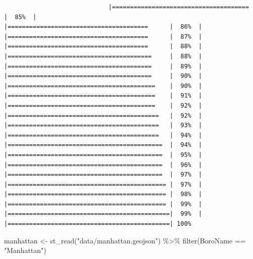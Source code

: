 \documentclass[
  krantz2]{krantz}
\makeatletter
\newenvironment{Shaded}{\begin{snugshade}}{\end{snugshade}}
\newcommand{\FunctionTok}[1]{\textcolor[rgb]{0,0,0}{#1}}
\newcommand{\NormalTok}[1]{#1}
\newcommand{\OtherTok}[1]{\textcolor[rgb]{0.37,0.37,0.37}{#1}}
\newcommand{\SpecialCharTok}[1]{\textcolor[rgb]{0,0,0}{#1}}
\newcommand{\StringTok}[1]{\textcolor[rgb]{0.5,0.5,0.5}{#1}}
\newenvironment{kframe}{%
\medskip{}
\setlength{\fboxsep}{.8em}
 \def\at@end@of@kframe{}%
 \ifinner\ifhmode%
  \def\at@end@of@kframe{\end{minipage}}%
  \begin{minipage}{\columnwidth}%
 \fi\fi%
 \def\FrameCommand##1{\hskip\@totalleftmargin \hskip-\fboxsep
 \colorbox{shadecolor}{##1}\hskip-\fboxsep
     \hskip-\linewidth \hskip-\@totalleftmargin \hskip\columnwidth}%
 \MakeFramed {\advance\hsize-\width
   \@totalleftmargin\z@ \linewidth\hsize
   \@setminipage}}%
 {\par\unskip\endMakeFramed%
 \at@end@of@kframe}
\renewenvironment{Shaded}{\begin{kframe}}{\end{kframe}}
\makeatother
\begin{document}
\begin{verbatim}
                             |======================================       |  85%  |                                                     |=======================================      |  86%  |                                                     |=======================================      |  87%  |                                                     |=======================================      |  88%  |                                                     |========================================     |  88%  |                                                     |========================================     |  89%  |                                                     |========================================     |  90%  |                                                     |=========================================    |  90%  |                                                     |=========================================    |  91%  |                                                     |=========================================    |  92%  |                                                     |==========================================   |  92%  |                                                     |==========================================   |  93%  |                                                     |==========================================   |  94%  |                                                     |===========================================  |  94%  |                                                     |===========================================  |  95%  |                                                     |===========================================  |  96%  |                                                     |===========================================  |  97%  |                                                     |============================================ |  97%  |                                                     |============================================ |  98%  |                                                     |============================================ |  99%  |                                                     |=============================================|  99%  |                                                     |=============================================| 100%
\end{verbatim}

\begin{Shaded}
\begin{Highlighting}[]
\NormalTok{manhattan }\OtherTok{\textless{}{-}} \FunctionTok{st\_read}\NormalTok{(}\StringTok{"data/manhattan.geojson"}\NormalTok{) }\SpecialCharTok{\%\textgreater{}\%}
  \FunctionTok{filter}\NormalTok{(BoroName }\SpecialCharTok{==} \StringTok{"Manhattan"}\NormalTok{)}
\end{Highlighting}
\end{Shaded}
\end{document}
